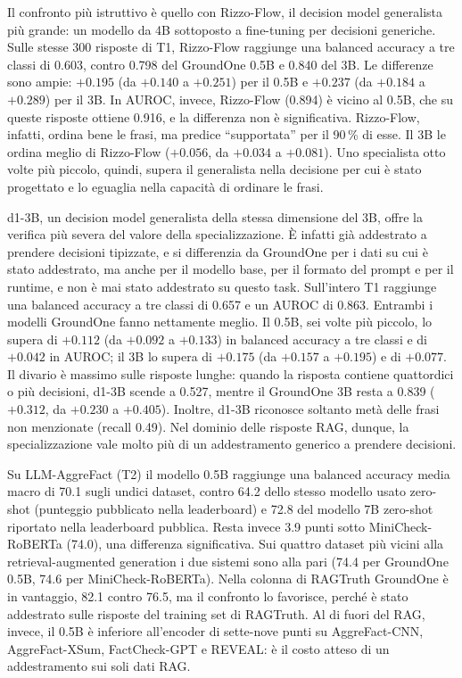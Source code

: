 Il confronto più istruttivo è quello con Rizzo-Flow, il decision model generalista più grande: un modello da 4B sottoposto a
fine-tuning per decisioni generiche. Sulle stesse 300 risposte di T1, Rizzo-Flow raggiunge una balanced accuracy a tre
classi di 0.603, contro 0.798 del GroundOne 0.5B e 0.840 del 3B. Le differenze sono ampie: $+0.195$ (da $+0.140$ a $+0.251$) per il 0.5B e $+0.237$ (da $+0.184$ a $+0.289$) per il 3B. In AUROC, invece, Rizzo-Flow (0.894) è vicino al
0.5B, che su queste risposte ottiene 0.916, e la differenza non è significativa. Rizzo-Flow, infatti, ordina bene le
frasi, ma predice ``supportata'' per il 90\,\% di esse. Il 3B le ordina meglio di Rizzo-Flow ($+0.056$, da $+0.034$ a $+0.081$). Uno specialista otto volte più piccolo, quindi, supera il generalista nella decisione per cui è stato
progettato e lo eguaglia nella capacità di ordinare le frasi.

d1-3B, un decision model generalista della stessa dimensione del 3B, offre la verifica più severa del valore della
specializzazione. È infatti già addestrato a prendere decisioni tipizzate, e si differenzia da GroundOne per i dati su cui è stato addestrato, ma anche per il modello base, per il formato del prompt e per il runtime, e non è mai stato addestrato su questo task. Sull'intero T1 raggiunge una balanced accuracy a tre classi di 0.657 e un AUROC di
0.863. Entrambi i modelli GroundOne fanno nettamente meglio. Il 0.5B, sei volte più piccolo, lo supera di $+0.112$ (da
$+0.092$ a $+0.133$) in balanced accuracy a tre classi e di $+0.042$ in AUROC; il 3B lo supera di $+0.175$ (da $+0.157$
a $+0.195$) e di $+0.077$. Il divario è massimo sulle risposte lunghe: quando la risposta contiene quattordici o più
decisioni, d1-3B scende a 0.527, mentre il GroundOne 3B resta a 0.839 ($+0.312$, da $+0.230$ a $+0.405$). Inoltre,
d1-3B riconosce soltanto metà delle frasi non menzionate (recall 0.49). Nel dominio delle risposte RAG, dunque, la
specializzazione vale molto più di un addestramento generico a prendere decisioni.

Su LLM-AggreFact (T2) il modello 0.5B raggiunge una balanced accuracy media macro di 70.1 sugli undici dataset, contro 64.2 dello stesso modello usato zero-shot (punteggio pubblicato nella leaderboard) e 72.8 del modello 7B zero-shot riportato nella leaderboard pubblica. Resta
invece 3.9 punti sotto MiniCheck-RoBERTa (74.0), una differenza significativa. Sui quattro dataset più vicini alla
retrieval-augmented generation i due sistemi sono alla pari (74.4 per GroundOne 0.5B, 74.6 per MiniCheck-RoBERTa). Nella colonna di RAGTruth GroundOne è in
vantaggio, 82.1 contro 76.5, ma il confronto lo favorisce, perché è stato addestrato sulle risposte del training set di
RAGTruth. Al di fuori del RAG, invece, il 0.5B è inferiore all'encoder di sette-nove punti su AggreFact-CNN,
AggreFact-XSum, FactCheck-GPT e REVEAL: è il costo atteso di un addestramento sui soli dati RAG.

